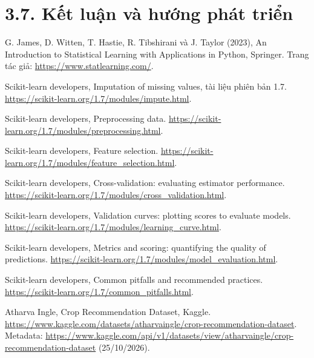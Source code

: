 \emptyspace

\section{3.7. Kết luận và hướng phát triển}

\emptyspace


{\noindent [1] G. James, D. Witten, T. Hastie, R. Tibshirani và J. Taylor (2023), An Introduction to Statistical Learning with Applications in Python, Springer. Trang tác giả: \url{https://www.statlearning.com/}.\par}\vspace{6pt}

{\noindent [2] Scikit-learn developers, Imputation of missing values, tài liệu phiên bản 1.7. \url{https://scikit-learn.org/1.7/modules/impute.html}.\par}\vspace{6pt}

{\noindent [3] Scikit-learn developers, Preprocessing data. \url{https://scikit-learn.org/1.7/modules/preprocessing.html}.\par}\vspace{6pt}

{\noindent [4] Scikit-learn developers, Feature selection. \url{https://scikit-learn.org/1.7/modules/feature_selection.html}.\par}\vspace{6pt}

{\noindent [5] Scikit-learn developers, Cross-validation: evaluating estimator performance. \url{https://scikit-learn.org/1.7/modules/cross_validation.html}.\par}\vspace{6pt}

{\noindent [6] Scikit-learn developers, Validation curves: plotting scores to evaluate models. \url{https://scikit-learn.org/1.7/modules/learning_curve.html}.\par}\vspace{6pt}

{\noindent [7] Scikit-learn developers, Metrics and scoring: quantifying the quality of predictions. \url{https://scikit-learn.org/1.7/modules/model_evaluation.html}.\par}\vspace{6pt}

{\noindent [8] Scikit-learn developers, Common pitfalls and recommended practices. \url{https://scikit-learn.org/1.7/common_pitfalls.html}.\par}\vspace{6pt}

{\noindent [9] Atharva Ingle, Crop Recommendation Dataset, Kaggle. \url{https://www.kaggle.com/datasets/atharvaingle/crop-recommendation-dataset}. Metadata: \url{https://www.kaggle.com/api/v1/datasets/view/atharvaingle/crop-recommendation-dataset} (25/10/2026).\par}\vspace{6pt}
